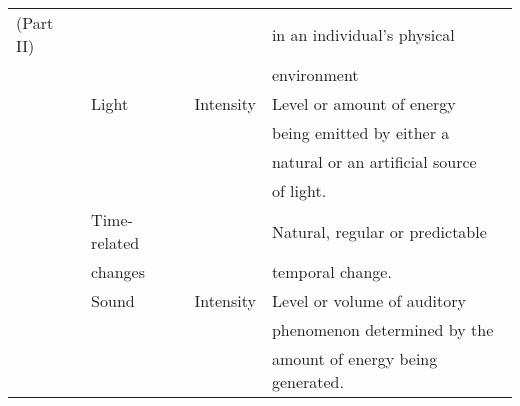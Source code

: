 \begin{table}
\begin{tabular}{l l l l}
    (Part II)	& 			& 		& in an individual's physical 	\\
		& 			& 		& environment			\\
		& Light			& Intensity	& Level or amount of energy 	\\
		& 			& 		& being emitted by either a 	\\
		& 			& 		& natural or an artificial source\\
		& 			& 		& of light.			\\
		& Time-related 		& 		& Natural, regular or predictable\\
		& changes		& 		& temporal change.		\\
		& Sound			& Intensity	& Level or volume of auditory 	\\
		& 			& 		& phenomenon determined by the	\\
		& 			& 		& amount of energy being generated.\\
    \hline
  \end{tabular}
\end{table}




% 
